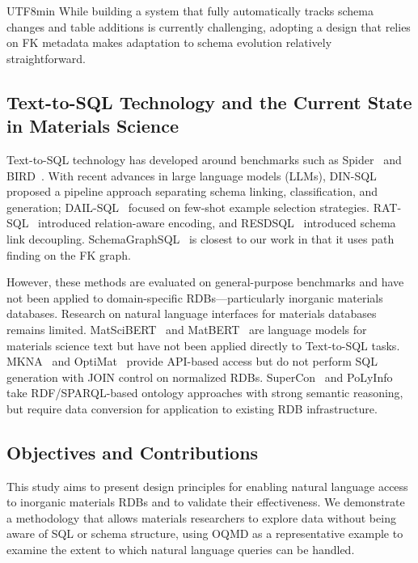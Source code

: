 \documentclass[sn-mathphys,Numbered]{sn-jnl}
\begin{document}
\begin{CJK}{UTF8}{min}
While building a system that fully automatically tracks schema changes
and table additions is currently challenging,
adopting a design that relies on FK metadata makes
adaptation to schema evolution relatively straightforward.

\subsection{Text-to-SQL Technology and the Current State in Materials Science}

Text-to-SQL technology has developed around benchmarks such as
Spider~\cite{yu2018spider} and BIRD~\cite{li2024bird}.
With recent advances in large language models (LLMs),
DIN-SQL~\cite{pourreza2024dinsql} proposed a pipeline approach
separating schema linking, classification, and generation;
DAIL-SQL~\cite{gao2023dail} focused on few-shot example selection strategies.
RAT-SQL~\cite{wang2020ratsql} introduced relation-aware encoding,
and RESDSQL~\cite{li2023resdsql} introduced schema link decoupling.
SchemaGraphSQL~\cite{safdarian2026schemagraphsql} is closest to our work
in that it uses path finding on the FK graph.

However, these methods are evaluated on general-purpose benchmarks
and have not been applied to domain-specific RDBs---particularly
inorganic materials databases.
Research on natural language interfaces for materials databases remains limited.
MatSciBERT~\cite{gupta2022matscibert} and MatBERT~\cite{walker2021matbert} are
language models for materials science text but have not been applied
directly to Text-to-SQL tasks.
MKNA~\cite{zhuang2026mkna} and OptiMat~\cite{hu2026optimat} provide
API-based access but do not perform SQL generation with JOIN control
on normalized RDBs.
SuperCon~\cite{ishii2023supercon} and PoLyInfo~\cite{ishii2024polyinfo}
take RDF/SPARQL-based ontology approaches with strong semantic reasoning,
but require data conversion for application to existing RDB infrastructure.

\subsection{Objectives and Contributions}

This study aims to present design principles for enabling
natural language access to inorganic materials RDBs
and to validate their effectiveness.
We demonstrate a methodology that allows materials researchers
to explore data without being aware of SQL or schema structure,
using OQMD as a representative example to examine the extent to which
natural language queries can be handled.


\end{CJK}
\end{document}
